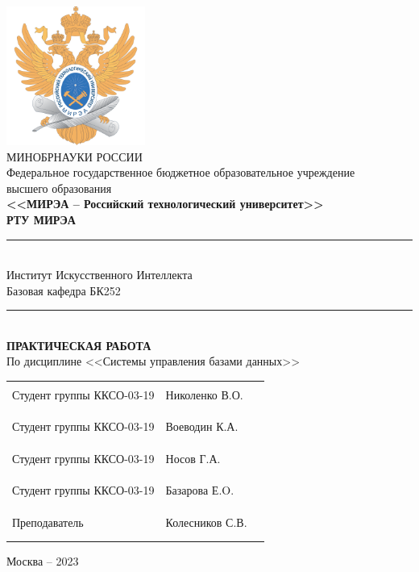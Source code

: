 \documentclass[utf8,14pt,a4paper,oneside,russian]{book}
\begin{document}
\thispagestyle{empty}
\small
\begin{center}
    \includegraphics[width=4.55cm]{logo_mirea}\\
    \MakeUppercase{Минобрнауки России}\\[1em]
    Федеральное государственное бюджетное образовательное учреждение\\
    высшего образования\\[0.5em]
    \textbf{<<МИРЭА -- Российский технологический университет>>}\\
    \textbf{РТУ МИРЭА}\\
    \rule{\textwidth}{0.75pt}\\
    Институт Искусственного Интеллекта\\
    Базовая кафедра БК252\\
    
    \rule{\textwidth}{0.75pt}\\[5em]
    \normalsize\MakeUppercase{\textbf{Практическая работа}}\small\\[0.5em]
    По дисциплине <<Системы управления базами данных>>\\[1.5em]
    \begin{tabular}{p{7cm}p{6cm}c}
        Студент группы ККСО-03-19 & Николенко В.О. & \rule{2cm}{0pt}                    \\[-0.5em]
                                  &                & \\[1em]
        Студент группы ККСО-03-19 & Воеводин К.А.  & \rule{2cm}{0pt}                    \\[-0.5em]
                                  &                & \\[1em]
        Студент группы ККСО-03-19 & Носов Г.А. & \rule{2cm}{0pt}                    \\[-0.5em]
                                  &                & \\[1em]
        Студент группы ККСО-03-19 & Базарова Е.O. & \rule{2cm}{0pt}                    \\[-0.5em]
                                  &                & \\[1em]
        Преподаватель             & Колесников С.В.  & \rule{2cm}{0pt}                    \\[-0.5em]
                                  &                & \\[5em]
    \end{tabular}
    \vfill
    Москва -- 2023
\end{center}
\normalsize
\newpage
\end{document}
